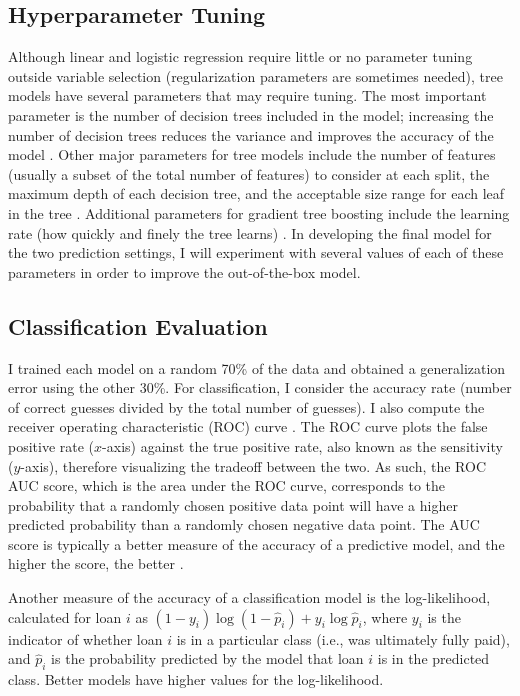 \documentclass[12pt]{article}
\begin{document}

\subsection{Hyperparameter Tuning}

Although linear and logistic regression require little or no parameter tuning outside variable selection (regularization parameters are sometimes needed), tree models have several parameters that may require tuning. The most important parameter is the number of decision trees included in the model; increasing the number of decision trees reduces the variance and improves the accuracy of the model \cite{breiman2001random}. Other major parameters for tree models include the number of features (usually a subset of the total number of features) to consider at each split, the maximum depth of each decision tree, and the acceptable size range for each leaf in the tree \cite{pedregosa2011scikit}. Additional parameters for gradient tree boosting include the learning rate (how quickly and finely the tree learns) \cite{chen2016xgboost}. In developing the final model for the two prediction settings, I will experiment with several values of each of these parameters in order to improve the out-of-the-box model.

\subsection{Classification Evaluation}

I trained each model on a random 70\% of the data and obtained a generalization error using the other 30\%. For classification, I consider the accuracy rate (number of correct guesses divided by the total number of guesses). I also compute the receiver operating characteristic (ROC) curve \cite{bradley1997use}. The ROC curve plots the false positive rate ($x$-axis) against the true positive rate, also known as the sensitivity ($y$-axis), therefore visualizing the tradeoff between the two. As such, the ROC AUC score, which is the area under the ROC curve, corresponds to the probability that a randomly chosen positive data point will have a higher predicted probability than a randomly chosen negative data point. The AUC score is typically a better measure of the accuracy of a predictive model, and the higher the score, the better \cite{bradley1997use}.

Another measure of the accuracy of a classification model is the log-likelihood, calculated for loan $i$ as $(1 - y_i)\log(1 - \hat{p}_i) + y_i\log \hat{p}_i$, where $y_i$ is the indicator of whether loan $i$ is in a particular class (i.e., was ultimately fully paid), and $\hat{p}_i$ is the probability predicted by the model that loan $i$ is in the predicted class. Better models have higher values for the log-likelihood. 
\end{document}
